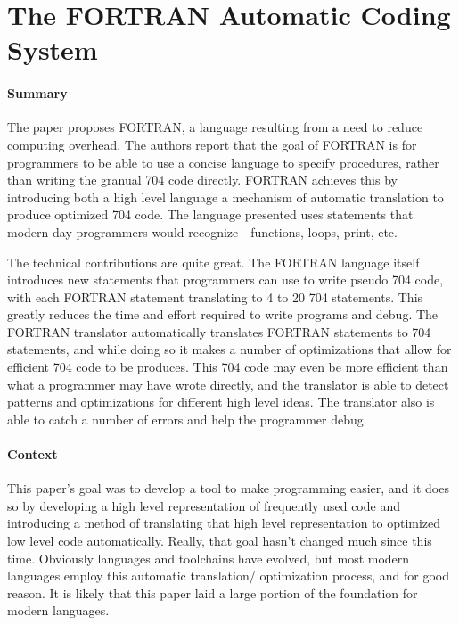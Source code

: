 \section {The FORTRAN Automatic Coding System \cite{backus1957fortran}}


\paragraph{\textbf{Summary}}
The paper proposes FORTRAN, a language resulting from a need to reduce computing
overhead. The authors report that the goal of FORTRAN is for programmers to be
able to use a concise language to specify procedures, rather than writing the
granual 704 code directly. FORTRAN achieves this by introducing both a high
level language a mechanism of automatic translation to produce optimized 704
code. The language presented uses statements that modern day programmers would
recognize - functions, loops, print, etc.

The technical contributions are quite great. The FORTRAN language itself
introduces new statements that programmers can use to write pseudo 704 code,
with each FORTRAN statement translating to 4 to 20 704 statements. This greatly
reduces the time and effort required to write programs and debug. The FORTRAN
translator automatically translates FORTRAN statements to 704 statements, and
while doing so it makes a number of optimizations that allow for efficient 704
code to be produces. This 704 code may even be more efficient than what a
programmer may have wrote directly, and the translator is able to detect
patterns and optimizations for different high level ideas. The translator also
is able to catch a number of errors and help the programmer debug.
\paragraph{\textbf{Context}}
This paper's goal was to develop a tool to make programming easier, and it does
so by developing a high level representation of frequently used code and
introducing a method of translating that high level representation to optimized
low level code automatically. Really, that goal hasn't changed much since this
time. Obviously languages and toolchains have evolved, but most modern languages
employ this automatic translation/ optimization process, and for good reason. It
is likely that this paper laid a large portion of the foundation for modern
languages.
